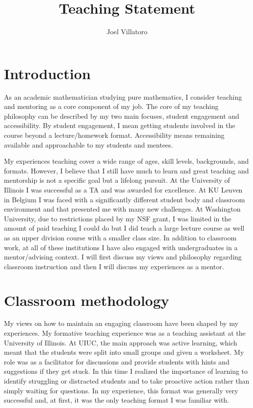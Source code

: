 \documentclass{article}
\title{Teaching Statement}
\author{Joel Villatoro}
\date{}
\begin{document}
\vspace{-0.5in}
\maketitle

\section*{Introduction}
As an academic mathematician studying pure mathematics, I consider teaching and mentoring as a core component of my job. 
The core of my teaching philosophy can be described by my two main focuses, student engagement and accessibility. 
By student engagement, I mean getting students involved in the course beyond a lecture/homework format. Accessibility means remaining available and approachable to my students and mentees.

My experiences teaching cover a wide range of ages, skill levels, backgrounds, and formats. However, I believe that I still have much to learn and great teaching and mentorship is not a specific goal but a lifelong pursuit. At the University of Illinois I was successful as a TA and was awarded for excellence. At KU Leuven in Belgium I was faced with a significantly different student body and classroom environment and that presented me with many new challenges. At Washington University, due to restrictions placed by my NSF grant, I was limited in the amount of paid teaching I could do but I did teach a large lecture course as well as an upper division course with a smaller class size. In addition to classroom work, at all of these institutions I have also engaged with undergraduates in a mentor/advising context. I will first discuss my views and philosophy regarding classroom instruction and then I will discuss my experiences as a mentor.

\section*{Classroom methodology}


My views on how to maintain an engaging classroom have been shaped by my experiences. My formative teaching experience was as a teaching assistant at the University of Illinois. At UIUC, the main approach was active learning, which meant that the students were split into small groups and given a worksheet. My role was as a facilitator for discussions and provide students with hints and suggestions if they get stuck. In this time I realized the importance of learning to identify struggling or distracted students and to take proactive action rather than simply waiting for questions. In my experience, this format was generally very successful and, at first, it was the only teaching format I was familiar with.
\end{document}
